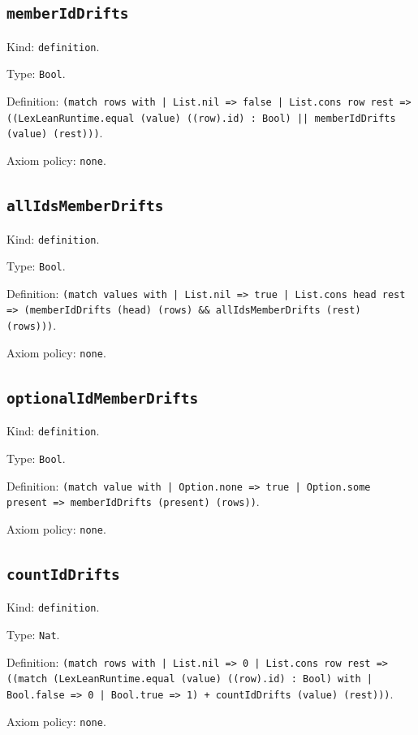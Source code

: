 \documentclass[11pt]{article}
\begin{document}
\subsection*{\texttt{memberIdDrifts}}
\noindent Kind: \texttt{definition}.\par
\noindent Type: \texttt{Bool}.\par
\noindent Definition: \texttt{(match rows with | List.nil => false | List.cons row rest => ((LexLeanRuntime.equal (value) ((row).id) : Bool) || memberIdDrifts (value) (rest)))}.\par
\noindent Axiom policy: \texttt{none}.\par
\subsection*{\texttt{allIdsMemberDrifts}}
\noindent Kind: \texttt{definition}.\par
\noindent Type: \texttt{Bool}.\par
\noindent Definition: \texttt{(match values with | List.nil => true | List.cons head rest => (memberIdDrifts (head) (rows) \&\& allIdsMemberDrifts (rest) (rows)))}.\par
\noindent Axiom policy: \texttt{none}.\par
\subsection*{\texttt{optionalIdMemberDrifts}}
\noindent Kind: \texttt{definition}.\par
\noindent Type: \texttt{Bool}.\par
\noindent Definition: \texttt{(match value with | Option.none => true | Option.some present => memberIdDrifts (present) (rows))}.\par
\noindent Axiom policy: \texttt{none}.\par
\subsection*{\texttt{countIdDrifts}}
\noindent Kind: \texttt{definition}.\par
\noindent Type: \texttt{Nat}.\par
\noindent Definition: \texttt{(match rows with | List.nil => 0 | List.cons row rest => ((match (LexLeanRuntime.equal (value) ((row).id) : Bool) with | Bool.false => 0 | Bool.true => 1) + countIdDrifts (value) (rest)))}.\par
\noindent Axiom policy: \texttt{none}.\par
\end{document}
